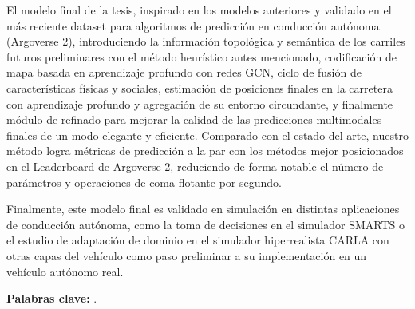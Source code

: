 El modelo final de la tesis, inspirado en los modelos anteriores y validado en el más reciente dataset para algoritmos de predicción en conducción autónoma (Argoverse 2), introduciendo la información topológica y semántica de los carriles futuros preliminares con el método heurístico antes mencionado, codificación de mapa basada en aprendizaje profundo con redes GCN, ciclo de fusión de características físicas y sociales, estimación de posiciones finales en la carretera con aprendizaje profundo y agregación de su entorno circundante, y finalmente módulo de refinado para mejorar la calidad de las predicciones multimodales finales de un modo elegante y eficiente. Comparado con el estado del arte, nuestro método logra métricas de predicción a la par con los métodos mejor posicionados en el Leaderboard de Argoverse 2, reduciendo de forma notable el número de parámetros y operaciones de coma flotante por segundo.

Finalmente, este modelo final es validado en simulación en distintas aplicaciones de conducción autónoma, como la toma de decisiones en el simulador SMARTS o el estudio de adaptación de dominio en el simulador hiperrealista CARLA con otras capas del vehículo como paso preliminar a su implementación en un vehículo autónomo real.

\textbf{Palabras clave:} \myThesisKeywords.



